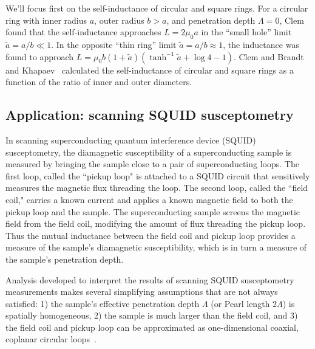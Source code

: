\documentclass[final,3p,times]{elsarticle}
\begin{document}
We'll focus first on the self-inductance of circular and square rings. For a circular ring with inner radius $a$, outer radius $b>a$, and penetration depth $\Lambda=0$, Clem~\cite{Babaei_Brojeny2003-la} found that the self-inductance approaches $L=2\mu_0 a$ in the ``small hole'' limit $\tilde{a}=a/b\ll 1$. In the opposite ``thin ring'' limit $\tilde{a}=a/b\approx 1$, the inductance was found to approach $L=\mu_0b(1+\tilde{a})(\tanh^{-1}\tilde{a}+\log 4 - 1)$. Clem and Brandt~\cite{Brandt2004-ew} and Khapaev~\cite{Khapaev1997-kw} calculated the self-inductance of circular and square rings as a function of the ratio of inner and outer diameters.

\subsection{Application: scanning SQUID susceptometry}
\label{section:examples:susceptometry}

In scanning superconducting quantum interference device (SQUID) susceptometry, the diamagnetic susceptibility of a superconducting sample is measured by bringing the sample close to a pair of superconducting loops. The first loop, called the ``pickup loop" is attached to a SQUID circuit that sensitively measures the magnetic flux threading the loop. The second loop, called the ``field coil," carries a known current and applies a known magnetic field to both the pickup loop and the sample. The superconducting sample screens the magnetic field from the field coil, modifying the amount of flux threading the pickup loop. Thus the mutual inductance between the field coil and pickup loop provides a measure of the sample's diamagnetic susceptibility, which is in turn a measure of the sample's penetration depth.

Analysis developed to interpret the results of scanning SQUID susceptometry measurements makes several simplifying assumptions that are not always satisfied: 1) the sample's effective penetration depth $\Lambda$ (or Pearl length $2\Lambda$) is spatially homogeneous, 2) the sample is much larger than the field coil, and 3) the field coil and pickup loop can be approximated as one-dimensional coaxial, coplanar circular loops~\cite{Kirtley_Kalisky_2012}.
\end{document}
